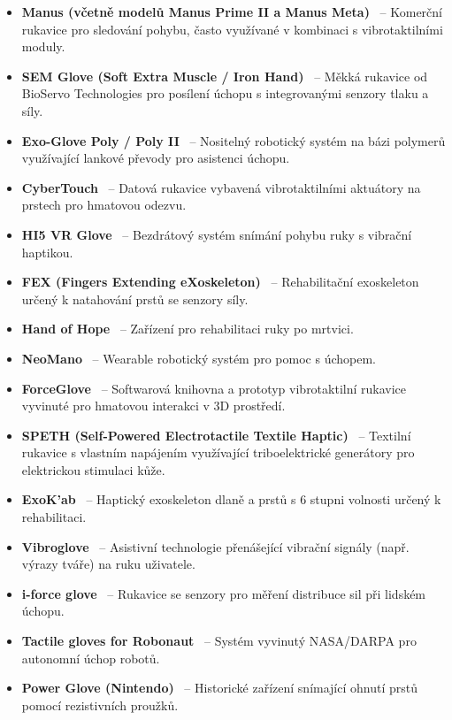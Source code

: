 \documentclass[FZS,DP]{tulthesis}
\begin{document}
\begin{itemize}
    \item \textbf{Manus (včetně modelů Manus Prime II a Manus Meta)}~\cite{Krycner2024,Zhang2025,GIUDICI2025,Mizrahi2023} – Komerční rukavice pro sledování pohybu, často využívané v kombinaci s vibrotaktilními moduly.
    \item \textbf{SEM Glove (Soft Extra Muscle / Iron Hand)}~\cite{Belcamino2024} – Měkká rukavice od BioServo Technologies pro posílení úchopu s integrovanými senzory tlaku a síly.
    \item \textbf{Exo-Glove Poly / Poly II}~\cite{Devaraja20201222,Thomas2023110} – Nositelný robotický systém na bázi polymerů využívající lankové převody pro asistenci úchopu.
    \item \textbf{CyberTouch}~\cite{Belcamino2024,GIUDICI2025} – Datová rukavice vybavená vibrotaktilními aktuátory na prstech pro hmatovou odezvu.
    \item \textbf{HI5 VR Glove}~\cite{Krycner2024} – Bezdrátový systém snímání pohybu ruky s vibrační haptikou.
    \item \textbf{FEX (Fingers Extending eXoskeleton)}~\cite{Belcamino2024} – Rehabilitační exoskeleton určený k natahování prstů se senzory síly.
    \item \textbf{Hand of Hope}~\cite{Belcamino2024} – Zařízení pro rehabilitaci ruky po mrtvici.
    \item \textbf{NeoMano}~\cite{Belcamino2024} – Wearable robotický systém pro pomoc s úchopem.
    \item \textbf{ForceGlove}~\cite{Nezval2011} – Softwarová knihovna a prototyp vibrotaktilní rukavice vyvinuté pro hmatovou interakci v 3D prostředí.
    \item \textbf{SPETH (Self-Powered Electrotactile Textile Haptic)}~\cite{Papakonstantinou20251218} – Textilní rukavice s vlastním napájením využívající triboelektrické generátory pro elektrickou stimulaci kůže.
    \item \textbf{ExoK’ab}~\cite{Belcamino2024} – Haptický exoskeleton dlaně a prstů s 6 stupni volnosti určený k rehabilitaci.
    \item \textbf{Vibroglove}~\cite{Coppola2022920} – Asistivní technologie přenášející vibrační signály (např. výrazy tváře) na ruku uživatele.
    \item \textbf{i-force glove}~\cite{GIUDICI2025} – Rukavice se senzory pro měření distribuce sil při lidském úchopu.
    \item \textbf{Tactile gloves for Robonaut}~\cite{Mohammadi2024418} – Systém vyvinutý NASA/DARPA pro autonomní úchop robotů.
    \item \textbf{Power Glove (Nintendo)}~\cite{Nyrobtseva2018,Krycner2024} – Historické zařízení snímající ohnutí prstů pomocí rezistivních proužků.
\end{itemize}
\end{document}
